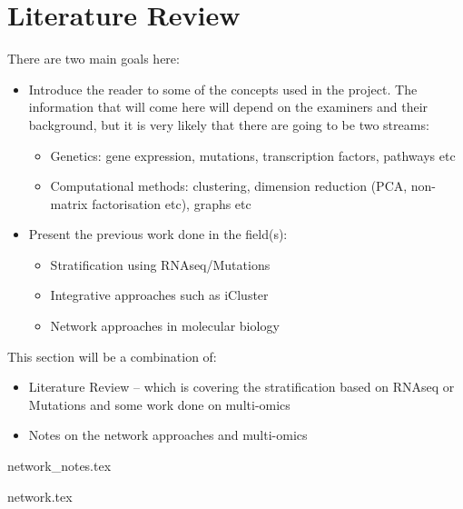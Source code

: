 \section{Literature Review}

There are two main goals here:
\begin{itemize}
    \item Introduce the reader to some of the concepts used in the project. The information that will come here will depend on the examiners and their background, but it is very likely that there are going to be two streams:
    \begin{itemize}
        \item Genetics: gene expression, mutations, transcription factors, pathways etc
        \item Computational methods: clustering, dimension reduction (PCA, non-matrix factorisation etc), graphs etc 
    \end{itemize}
    \item Present the previous work done in the field(s):
    \begin{itemize}
        \item Stratification using RNAseq/Mutations
        \item Integrative approaches such as iCluster
        \item Network approaches in molecular biology  
    \end{itemize}
\end{itemize}

This section will be a combination of:
\begin{itemize}
    \item Literature Review -- which is covering the stratification based on RNAseq or Mutations and some work done on multi-omics
    \item Notes on the network approaches and multi-omics
\end{itemize}




{network_notes.tex}

{network.tex}




